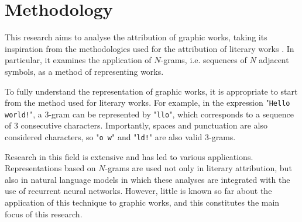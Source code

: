 \chapter{Methodology}
\label{chap:methodology}
\begin{toReview}
This research aims to analyse the attribution of graphic works, taking its inspiration from the methodologies used for the attribution of literary works \citep[see][]{thesis}. In particular, it examines the application of $N$-grams, i.e. sequences of $N$ adjacent symbols, as a method of representing works.

\noindent To fully understand the representation of graphic works, it is appropriate to start from the method used for literary works. For example, in the expression "\texttt{Hello world!}", a $3$-gram can be represented by "\texttt{llo}", which corresponds to a sequence of $3$ consecutive characters. Importantly, spaces and punctuation are also considered characters, so "\texttt{o w}" and "\texttt{ld!}" are also valid $3$-grams.

\noindent Research in this field is extensive and has led to various applications. Representations based on $N$-grams are used not only in literary attribution, but also in natural language models in which these analyses are integrated with the use of recurrent neural networks. However, little is known so far about the application of this technique to graphic works, and this constitutes the main focus of this research.


\end{toReview}
